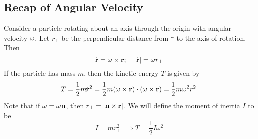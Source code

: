 \documentclass{article}
\begin{document}
\subsection{Recap of Angular Velocity}
Consider a particle rotating about an axis through the origin with angular velocity $\vb \omega$. Let $r_\perp$ be the perpendicular distance from $\vb r$ to the axis of rotation. Then
\[ \dot{\vb r} = \vb\omega \times \vb r;\quad \abs{\dot{\vb r}} = \omega r_\perp \]
If the particle has mass $m$, then the kinetic energy $T$ is given by
\[ T = \frac{1}{2}m\dot{\vb r}^2 = \frac{1}{2}m (\vb\omega \times \vb r) \cdot (\vb\omega \times \vb r) = \frac{1}{2}m\omega^2 r_\perp^2 \]
Note that if $\vb\omega = \omega \vb n$, then $r_\perp = \abs{\vb n \times \vb r}$. We will define the moment of inertia $I$ to be
\[ I = mr_\perp^2 \implies T = \frac{1}{2}I\omega^2 \]
\end{document}
